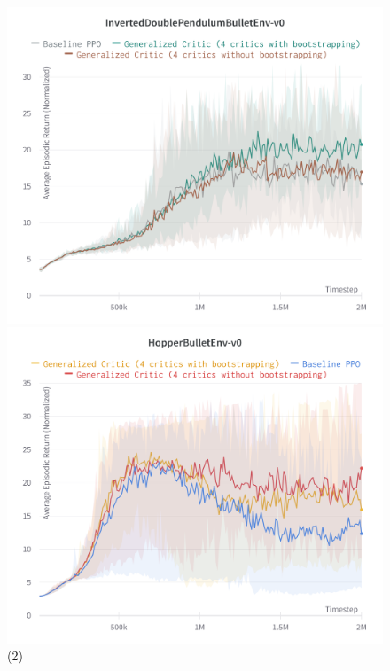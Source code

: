 \begin{figure}[!htb]
\begin{minipage}[b]{.5\linewidth}
  \centering
  \centerline{\includegraphics[width=\linewidth]{images/inverteddoublependulum}}
\end{minipage}
\begin{minipage}[b]{.5\linewidth}
  \centering
  \centerline{\includegraphics[width=\linewidth]{images/hopper}}
\end{minipage}
\caption{(2)}
\label{exp2}
\end{figure}
